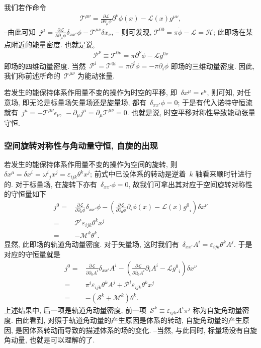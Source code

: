 我们若作命令
\begin{align}
\mathcal{T}^{\mu\nu}=\frac{\partial\mathcal{L}}{\partial\partial_\mu\phi}\partial^\nu\phi(x)-\mathcal{L}(x)g^{\mu\nu},
\end{align}
--由此可知~$j^\mu=\frac{\partial\mathcal{L}}{\partial\partial_\mu\phi}\delta_{xx'}\phi-\mathcal{T}^{\mu\nu}\delta x_\nu$, -- 则可发现, $\mathcal{T}^{00}=\pi\dot{\phi}-\mathcal{L}=\mathcal{H}$; 此即场在某点附近的能量密度. 也就是说,
\begin{align}
\mathcal{P}^\nu\equiv\mathcal{T}^{0\nu}=\pi\partial^\nu\phi-\mathcal{L}g^{0\nu}
\end{align}
即场的四维动量密度. 当然~$\mathcal{P}^i=\mathcal{T}^{0i}=\pi\partial^i\phi=-\pi\partial_i\phi$ 即场的三维动量密度. 因此, 我们称前述所命的~$\mathcal{T}^{\mu\nu}$ 为能动张量.

若发生的能保持体系作用量不变的操作为时空的平移, 即~$\delta x^\mu=\epsilon^\mu$, 则可知, 对任意场, 即无论是标量场矢量场还是旋量场, 都有~$\delta_{xx'}\phi=0$; 于是有代入诺特守恒流就有~$j^\mu=-\mathcal{T}^{\mu\nu}\epsilon_\nu,~-\partial_\mu j^\mu=\partial_\mu\mathcal{T}^{\mu\nu}=0$. 也就是说, 时空平移对称性导致能动张量守恒.



\subsubsection{空间旋转对称性与角动量守恒, 自旋的出现}

若发生的能保持体系作用量不变的操作为空间的旋转, 则~$\delta x^\mu=\delta x^i={\omega^i}_jx^j=\varepsilon_{ijk}\theta^k x^j$; 前式中已设体系的转动是逆着~$k$ 轴看来顺时针进行的. 对于标量场, 在旋转下亦有~$\delta_{xx'}\phi=0$, 故我们可拿出其对应于空间旋转对称性的守恒量如下
\begin{align}
j^0=&\frac{\partial\mathcal{L}}{\partial\partial_0\phi}\delta_{xx'}\phi-\left(\frac{\partial\mathcal{L}}{\partial\partial_0\phi}\partial_i\phi(x)-\mathcal{L}(x){g^0}_i\right)\delta x^\nu\nonumber\\
=&\mathcal{P}^i\varepsilon_{ijk}\theta^k x^j\\
=&-\mathcal{M}^k\theta^k.
\end{align}
显然, 此即场的轨道角动量密度. 对于矢量场, 这时我们有~$\delta_{xx'}A^i=\varepsilon_{ijk}\theta^k A^j$. 于是对应的守恒量就是
\begin{align}
j^0=&\frac{\partial\mathcal{L}}{\partial\partial_0A^i}\delta_{xx'}A^i-\left(\frac{\partial\mathcal{L}}{\partial\partial_0A^i}\partial_iA^i-\mathcal{L}{g^0}_i\right)\delta x^\nu\nonumber\\
=&\pi^i \varepsilon_{ijk}\theta^k A^j+\mathcal{P}^i\varepsilon_{ijk}\theta^k x^j\nonumber\\
=&-(\mathcal{S}^k+\mathcal{M}^k)\theta^k.
\end{align}
上述结果中, 后一项是轨道角动量密度, 前一项~$\mathcal{S}^k\equiv \varepsilon_{ijk}A^i\pi^j$ 称为自旋角动量密度. 由此看到, 对照于轨道角动量的产生原因是体系的转动, 自旋角动量的产生原因, 是因体系转动而导致的描述体系的场的变化. --当然, 与此同时, 标量场没有自旋角动量, 也就是可以理解的了.

